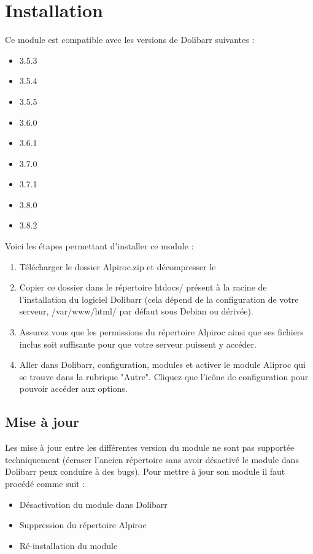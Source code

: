 \documentclass[a4paper,11pt]{article}
\begin{document}
\section{Installation}
Ce module est compatible avec les versions de Dolibarr suivantes :
\begin{itemize}
  \item 3.5.3
  \item 3.5.4
  \item 3.5.5
  \item 3.6.0
  \item 3.6.1
  \item 3.7.0
  \item 3.7.1
  \item 3.8.0
  \item 3.8.2
\end{itemize}
Voici les étapes permettant d'installer ce module :
\begin{enumerate}
  \item Télécharger le dossier Alpiroc.zip et décompresser le
  \item Copier ce dossier dans le répertoire htdocs/ présent à la racine de l'installation du logiciel Dolibarr (cela dépend de la configuration de votre serveur, /var/www/html/ par défaut sous Debian ou dérivée).
  \item Assurez vous que les permissions du répertoire Alpiroc ainsi que ses fichiers inclus soit suffisante pour que votre serveur puissent y accéder.
  \item Aller dans Dolibarr, configuration, modules et activer le module Aliproc qui se trouve dans la rubrique "Autre". Cliquez que l’icône de configuration pour pouvoir accéder aux options.
\end{enumerate}

\subsection{Mise à jour}
Les mise à jour entre les différentes version du module ne sont pas supportée techniquement (écraser l'ancien répertoire sans avoir désactivé le module dans Dolibarr peux conduire à des bugs). Pour mettre à jour son module il faut procédé comme suit :\\

\begin{itemize}
   \item Désactivation du module dans Dolibarr
   \item Suppression du répertoire Alpiroc
   \item Ré-installation du module
 \end{itemize} 
\end{document}
